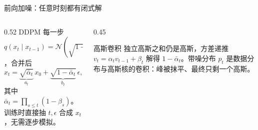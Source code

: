 \documentclass[aspectratio=169,10pt,UTF8,fontset=none]{ctexbeamer}
\begin{document}
\newcommand{\difpanel}[4]{%
  \begin{axis}[genai,#4,width=4.1cm,height=3.2cm,xmin=-4,xmax=4,ymin=0,ymax=0.75,xtick=\empty,ytick=\empty,domain=-4:4,samples=201,title={\scriptsize #3},title style={yshift=-1.2ex}]
    \addplot[GTeal,fill=GSky] {ptmix(x,#1,#2)} \closedcycle;
  \end{axis}}

\begin{frame}{前向加噪：任意时刻都有闭式解}
  \centering
  \vspace{2mm}
  \begin{columns}[T]
    \begin{column}{0.52\textwidth}
      DDPM 每一步 $q(x_t\mid x_{t-1})=\mathcal N(\sqrt{1-\beta_t}\,x_{t-1},\beta_tI)$，合并后
      \[
        x_t=\underbrace{\sqrt{\bar\alpha_t}}_{a_t}\,x_0+\underbrace{\sqrt{1-\bar\alpha_t}}_{b_t}\,\epsilon,\quad \epsilon\sim\mathcal N(0,I)
      \]
      其中 $\bar\alpha_t=\prod_{s\le t}(1-\beta_s)$。训练时直接抽 $t,\epsilon$ 合成 $x_t$，无需逐步模拟。
    \end{column}
    \begin{column}{0.45\textwidth}
      \begin{concept}{高斯卷积}
        独立高斯之和仍是高斯，方差递推 $v_t=\alpha_tv_{t-1}+\beta_t$ 解得 $1-\bar\alpha_t$。带噪分布 $p_t$ 是数据分布与高斯核的卷积：峰被抹平、最终只剩一个高斯。
      \end{concept}
    \end{column}
  \end{columns}
\end{frame}
\end{document}
